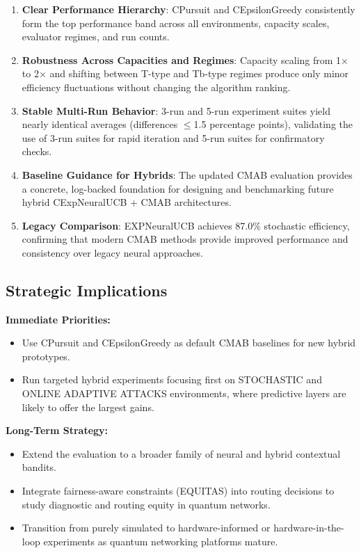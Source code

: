 \documentclass[12pt,a4paper]{article}
\newcommand{\legacy}[1]{\textcolor{legacycolor}{\textbf{#1}}}
\begin{document}
\begin{enumerate}
\item \textbf{Clear Performance Hierarchy}: CPursuit and CEpsilonGreedy consistently form the top performance band across all environments, capacity scales, evaluator regimes, and run counts.
\item \textbf{Robustness Across Capacities and Regimes}: Capacity scaling from 1$\times$ to 2$\times$ and shifting between T-type and Tb-type regimes produce only minor efficiency fluctuations without changing the algorithm ranking.
\item \textbf{Stable Multi-Run Behavior}: 3-run and 5-run experiment suites yield nearly identical averages (differences $\leq$1.5 percentage points), validating the use of 3-run suites for rapid iteration and 5-run suites for confirmatory checks.
\item \textbf{Baseline Guidance for Hybrids}: The updated CMAB evaluation provides a concrete, log-backed foundation for designing and benchmarking future hybrid CExpNeuralUCB + CMAB architectures.
\item \legacy{Legacy Comparison}: EXPNeuralUCB achieves 87.0\% stochastic efficiency, confirming that modern CMAB methods provide improved performance and consistency over legacy neural approaches.
\end{enumerate}

\subsection{Strategic Implications}

\textbf{Immediate Priorities:}
\begin{itemize}
\item Use CPursuit and CEpsilonGreedy as default CMAB baselines for new hybrid prototypes.
\item Run targeted hybrid experiments focusing first on STOCHASTIC and ONLINE ADAPTIVE ATTACKS environments, where predictive layers are likely to offer the largest gains.
\end{itemize}

\textbf{Long-Term Strategy:}
\begin{itemize}
\item Extend the evaluation to a broader family of neural and hybrid contextual bandits.
\item Integrate fairness-aware constraints (EQUITAS) into routing decisions to study diagnostic and routing equity in quantum networks.
\item Transition from purely simulated to hardware-informed or hardware-in-the-loop experiments as quantum networking platforms mature.
\end{itemize}
\end{document}

